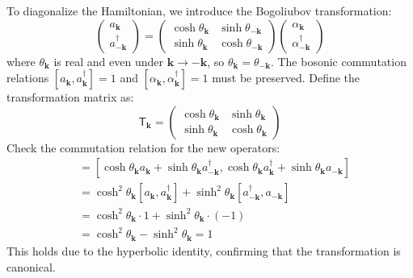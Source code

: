 To diagonalize the Hamiltonian, we introduce the Bogoliubov transformation:
\begin{equation}
    \begin{pmatrix}
        a_{\mathbf{k}} \\
        a^{\dagger}_{-\mathbf{k}}
    \end{pmatrix}
    =
    \begin{pmatrix}
        \cosh \theta_{\mathbf{k}} & \sinh \theta_{-\mathbf{k}} \\
        \sinh \theta_{\mathbf{k}} & \cosh \theta_{-\mathbf{k}}
    \end{pmatrix}
    \begin{pmatrix}
        \alpha_{\mathbf{k}} \\
        \alpha^{\dagger}_{-\mathbf{k}}
    \end{pmatrix}
\end{equation}
where $ \theta_{\mathbf{k}} $ is real and even under $ \mathbf{k} \to -\mathbf{k} $, so $ \theta_{\mathbf{k}} = \theta_{-\mathbf{k}} $. The bosonic commutation relations $ [a_{\mathbf{k}}, a^{\dagger}_{\mathbf{k}}] = 1 $ and $ [\alpha_{\mathbf{k}}, \alpha^{\dagger}_{\mathbf{k}}] = 1 $ must be preserved. Define the transformation matrix as:
\begin{equation}
    \mathsf{T}_{\mathbf{k}} = 
    \begin{pmatrix}
        \cosh \theta_{\mathbf{k}} & \sinh \theta_{\mathbf{k}} \\
        \sinh \theta_{\mathbf{k}} & \cosh \theta_{\mathbf{k}}
    \end{pmatrix}
\end{equation}
Check the commutation relation for the new operators:
\begin{align}
    [\alpha_{\mathbf{k}}, \alpha^{\dagger}_{\mathbf{k}}] 
    &= [\cosh \theta_{\mathbf{k}} a_{\mathbf{k}} + \sinh \theta_{\mathbf{k}} a^{\dagger}_{-\mathbf{k}}, \cosh \theta_{\mathbf{k}} a^{\dagger}_{\mathbf{k}} + \sinh \theta_{\mathbf{k}} a_{-\mathbf{k}}]   \\
    &= \cosh^2 \theta_{\mathbf{k}} [a_{\mathbf{k}}, a^{\dagger}_{\mathbf{k}}] + \sinh^2 \theta_{\mathbf{k}} [a^{\dagger}_{-\mathbf{k}}, a_{-\mathbf{k}}]   \\
    &= \cosh^2 \theta_{\mathbf{k}} \cdot 1 + \sinh^2 \theta_{\mathbf{k}} \cdot (-1)   \\
    &= \cosh^2 \theta_{\mathbf{k}} - \sinh^2 \theta_{\mathbf{k}} = 1
\end{align}
This holds due to the hyperbolic identity, confirming that the transformation is canonical.

